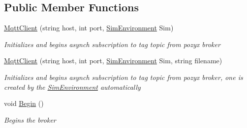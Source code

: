 \subsection*{Public Member Functions}
\begin{DoxyCompactItemize}
\item 
\hyperlink{class_pozyx_positioner_1_1_framework_1_1_mqtt_client_a4e2ab3ac03e686e3b85fe50d1a02feb8}{Mqtt\+Client} (string host, int port, \hyperlink{class_pozyx_positioner_1_1_framework_1_1_sim_environment}{Sim\+Environment} Sim)
\begin{DoxyCompactList}\small\item\em Initializes and begins asynch subscription to tag topic from pozyx broker \end{DoxyCompactList}\item 
\hyperlink{class_pozyx_positioner_1_1_framework_1_1_mqtt_client_aed3db79610eeaa328698f435c519c791}{Mqtt\+Client} (string host, int port, \hyperlink{class_pozyx_positioner_1_1_framework_1_1_sim_environment}{Sim\+Environment} Sim, string filename)
\begin{DoxyCompactList}\small\item\em Initializes and begins asynch subscription to tag topic from pozyx broker, one is created by the \hyperlink{class_pozyx_positioner_1_1_framework_1_1_sim_environment}{Sim\+Environment} automatically \end{DoxyCompactList}\item 
void \hyperlink{class_pozyx_positioner_1_1_framework_1_1_mqtt_client_aa08cbaf1de4adeae85b39edc92791ab9}{Begin} ()
\begin{DoxyCompactList}\small\item\em Begins the broker \end{DoxyCompactList}\end{DoxyCompactItemize}
